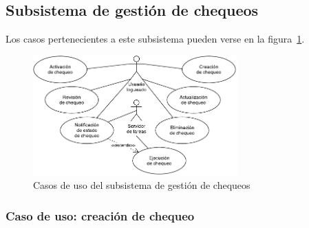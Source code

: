 \subsection{Subsistema de gestión de chequeos}

Los casos pertenecientes a este subsistema pueden verse en la figura~\ref{fig:subsistema-chequeos}.

\begin{figure}[htbp]
  \centering
  \includegraphics[width=0.7\textwidth]{4_analisis/diagrama_subsistema_gestion_chequeos}
  \caption{Casos de uso del subsistema de gestión de chequeos}
  \label{fig:subsistema-chequeos}
\end{figure}

\subsubsection{Caso de uso: creación de chequeo}

